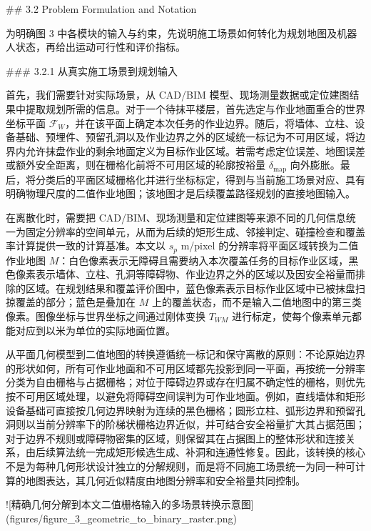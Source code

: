 ## 3.2 Problem Formulation and Notation

为明确图 3 中各模块的输入与约束，先说明施工场景如何转化为规划地图及机器人状态，再给出运动可行性和评价指标。

### 3.2.1 从真实施工场景到规划输入

  

首先，我们需要针对实际场景，从 CAD/BIM 模型、现场测量数据或定位建图结果中提取规划所需的信息。对于一个待抹平楼层，首先选定与作业地面重合的世界坐标平面 $\mathcal F_W$，并在该平面上确定本次任务的作业边界。随后，将墙体、立柱、设备基础、预埋件、预留孔洞以及作业边界之外的区域统一标记为不可用区域，将边界内允许抹盘作业的剩余地面定义为目标作业区域。若需考虑定位误差、地图误差或额外安全距离，则在栅格化前将不可用区域的轮廓按裕量 $\delta_{\mathrm{map}}$ 向外膨胀。最后，将分类后的平面区域栅格化并进行坐标标定，得到与当前施工场景对应、具有明确物理尺度的二值作业地图；该地图才是后续覆盖路径规划的直接地图输入。

  

在离散化时，需要把 CAD/BIM、现场测量和定位建图等来源不同的几何信息统一为固定分辨率的空间单元，从而为后续的矩形生成、邻接判定、碰撞检查和覆盖率计算提供一致的计算基准。本文以 $s_p$ m/pixel 的分辨率将平面区域转换为二值作业地图 $M$：白色像素表示无障碍且需要纳入本次覆盖任务的目标作业区域，黑色像素表示墙体、立柱、孔洞等障碍物、作业边界之外的区域以及因安全裕量而排除的区域。在规划结果和覆盖评价图中，蓝色像素表示目标作业区域中已被抹盘扫掠覆盖的部分；蓝色是叠加在 $M$ 上的覆盖状态，而不是输入二值地图中的第三类像素。图像坐标与世界坐标之间通过刚体变换 $T_{WM}$ 进行标定，使每个像素单元都能对应到以米为单位的实际地面位置。

  

从平面几何模型到二值地图的转换遵循统一标记和保守离散的原则：不论原始边界的形状如何，所有可作业地面和不可用区域都先投影到同一平面，再按统一分辨率分类为自由栅格与占据栅格；对位于障碍边界或存在归属不确定性的栅格，则优先按不可用区域处理，以避免将障碍空间误判为可作业地面。例如，直线墙体和矩形设备基础可直接按几何边界映射为连续的黑色栅格；圆形立柱、弧形边界和预留孔洞则以当前分辨率下的阶梯状栅格边界近似，并可结合安全裕量扩大其占据范围；对于边界不规则或障碍物密集的区域，则保留其在占据图上的整体形状和连接关系，由后续算法统一完成矩形候选生成、补洞和连通性修复。因此，该转换的核心不是为每种几何形状设计独立的分解规则，而是将不同施工场景统一为同一种可计算的地图表达，其几何近似精度由地图分辨率和安全裕量共同控制。

![精确几何分解到本文二值栅格输入的多场景转换示意图](figures/figure_3_geometric_to_binary_raster.png)

